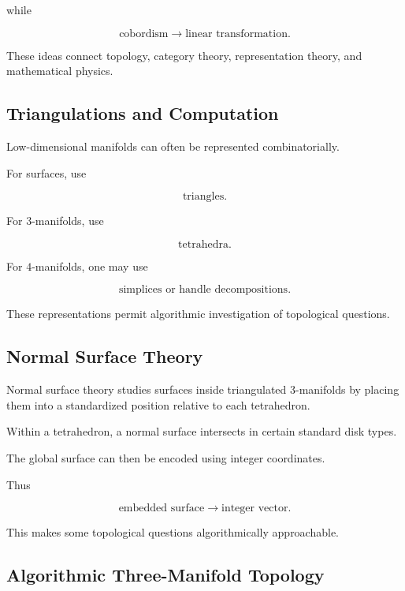 while

\[
\boxed{
\text{cobordism}
\longrightarrow
\text{linear transformation}.
}
\]

These ideas connect topology, category theory, representation theory, and
mathematical physics.

\subsection{Triangulations and Computation}
\label{subsec:low-dimensional-computation}

Low-dimensional manifolds can often be represented combinatorially.

For surfaces, use

\[
\boxed{
\text{triangles}.
}
\]

For \(3\)-manifolds, use

\[
\boxed{
\text{tetrahedra}.
}
\]

For \(4\)-manifolds, one may use

\[
\boxed{
\text{simplices or handle decompositions}.
}
\]

These representations permit algorithmic investigation of topological
questions.

\subsection{Normal Surface Theory}
\label{subsec:normal-surface-theory}

Normal surface theory studies surfaces inside triangulated \(3\)-manifolds
by placing them into a standardized position relative to each tetrahedron.

Within a tetrahedron, a normal surface intersects in certain standard disk
types.

The global surface can then be encoded using integer coordinates.

Thus

\[
\boxed{
\text{embedded surface}
\longrightarrow
\text{integer vector}.
}
\]

This makes some topological questions algorithmically approachable.

\subsection{Algorithmic Three-Manifold Topology}
\label{subsec:algorithmic-three-manifold-topology}


